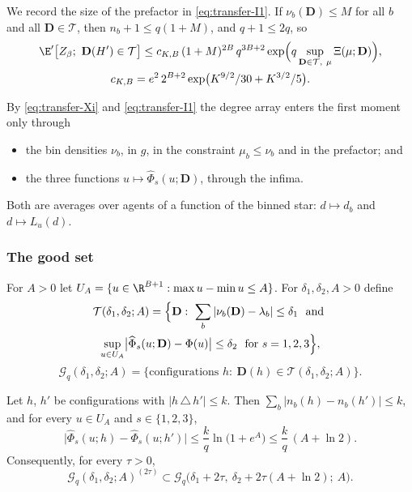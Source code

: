 We record the size of the prefactor in \eqref{eq:transfer-I1}. If $\nu_b(\mathbf D)\le M$ for
all $b$ and all $\mathbf D\in\mathcal T$, then $n_b+1\le q(1+M)$, and $q+1\le2q$, so
\begin{equation}\label{eq:transfer-prefactor}
\begin{gathered}
\E'\bigl[Z_\beta;\ \mathbf D(H')\in\mathcal T\bigr]\le c_{K,B}\,(1+M)^{2B}\,q^{3B+2}
\exp\Bigl(q\sup_{\mathbf D\in\mathcal T,\ \mu}\Xi(\mu;\mathbf D)\Bigr),\\
c_{K,B}=e^2\,2^{B+2}\exp\bigl(K^{9/2}/30+K^{3/2}/5\bigr).
\end{gathered}
\end{equation}

By \eqref{eq:transfer-Xi} and \eqref{eq:transfer-I1} the degree array enters the first moment
only through
\begin{itemize}
\item[(F1)] the bin densities $\nu_b$, in $g$, in the constraint $\mu_b\le\nu_b$ and in the
prefactor; and
\item[(F2)] the three functions $u\mapsto\widehat\Phi_s(u;\mathbf D)$, through the infima.
\end{itemize}
Both are averages over agents of a function of the binned star: $d\mapsto d_b$ and
$d\mapsto L_u(d)$.

\subsubsection*{The good set}

For $A>0$ let $U_A=\{u\in\R^{B+1}:\max u-\min u\le A\}$. For $\delta_1,\delta_2,A>0$ define
\begin{multline}\label{eq:transfer-good}
\mathcal T(\delta_1,\delta_2;A)=\Bigl\{\mathbf D:\ \sum_b|\nu_b(\mathbf D)-\lambda_b|\le\delta_1
\ \text{ and }\\
\sup_{u\in U_A}\bigl|\widehat\Phi_s(u;\mathbf D)-\Phi(u)\bigr|\le\delta_2\ \text{ for }s=1,2,3\Bigr\},
\end{multline}
\[
\mathcal G_q(\delta_1,\delta_2;A)=\bigl\{\text{configurations }h:\ \mathbf D(h)\in\mathcal T(\delta_1,\delta_2;A)\bigr\}.
\]

\begin{lemma}[Stability]\label{lem:transfer-stability}
Let $h$, $h'$ be configurations with $|h\,\triangle\,h'|\le k$. Then
$\sum_b|n_b(h)-n_b(h')|\le k$, and for every $u\in U_A$ and $s\in\{1,2,3\}$,
\[
\bigl|\widehat\Phi_s(u;h)-\widehat\Phi_s(u;h')\bigr|\le\frac kq\ln\bigl(1+e^A\bigr)\le\frac kq\,(A+\ln2).
\]
Consequently, for every $\tau>0$,
\begin{equation}\label{eq:transfer-enlarged}
\mathcal G_q(\delta_1,\delta_2;A)^{(2\tau)}\subset
\mathcal G_q\bigl(\delta_1+2\tau,\ \delta_2+2\tau(A+\ln2);\ A\bigr).
\end{equation}
\end{lemma}

